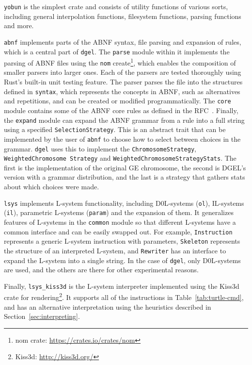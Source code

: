 \texttt{yobun} is the simplest crate and consists of utility functions of various sorts, including general interpolation functions, filesystem functions, parsing functions and more.

\texttt{abnf} implements parts of the ABNF syntax, file parsing and expansion of rules, which is a central part of \texttt{dgel}.
The \texttt{parse} module within it implements the parsing of ABNF files using the \texttt{nom} create\footnote{nom crate: \url{https://crates.io/crates/nom}}, which enables the composition of smaller parsers into larger ones.
Each of the parsers are tested thoroughly using Rust's built-in unit testing feature.
The parser parses the file into the structures defined in \texttt{syntax}, which represents the concepts in ABNF, such as alternatives and repetitions, and can be created or modified programmatically.
The \texttt{core} module contains some of the ABNF core rules as defined in the RFC~\cite{RFC5234}.
Finally, the \texttt{expand} module can expand the ABNF grammar from a rule into a full string using a specified \texttt{SelectionStrategy}.
This is an abstract trait that can be implemented by the user of \texttt{abnf} to choose how to select between choices in the grammar.
\texttt{dgel} uses this to implement the \texttt{ChromosomeStrategy}, \texttt{WeightedChromosome Strategy} and \texttt{WeightedChromosomeStrategyStats}.
The first is the implementation of the original \gls{GE} chromosome, the second is \gls{DGEL}'s version with a grammar distribution, and the last is a strategy that gathers stats about which choices were made.

\texttt{lsys} implements \gls{L-system} functionality, including D0L-systems (\texttt{ol}), IL-systems (\texttt{il}), parametric \glspl{L-system} (\texttt{param}) and the expansion of them.
It generalizes features of \glspl{L-system} in the \texttt{common} module so that different \glspl{L-system} have a common interface and can be easily swapped out.
For example, \texttt{Instruction} represents a generic \gls{L-system} instruction with parameters, \texttt{Skeleton} represents the structure of an interpreted \gls{L-system}, and \texttt{Rewriter} has an interface to expand the \gls{L-system} into a single string.
In the case of \texttt{dgel}, only D0L-systems are used, and the others are there for other experimental reasons.

Finally, \texttt{lsys\_kiss3d} is the \gls{L-system} interpreter implemented using the Kiss3d crate for rendering\footnote{Kiss3d: \url{http://kiss3d.org/}}.
It supports all of the instructions in Table~\ref{tab:turtle-cmd}, and has an alternative interpretation using the heuristics described in Section~\ref{sec:interpreting}.

